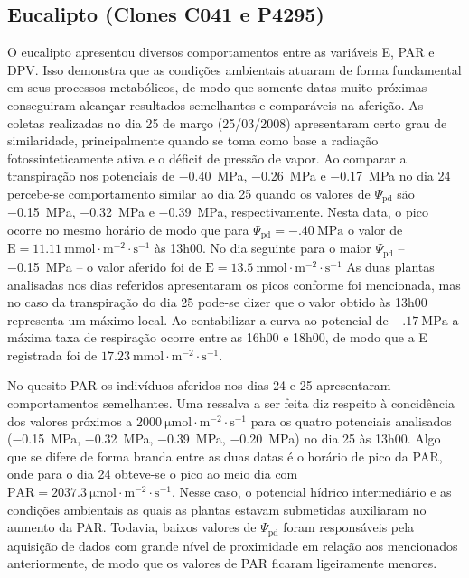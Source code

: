 \documentclass[a4paper, 12pt]{article}
\begin{document}
	\subsection{Eucalipto (Clones C041 e P4295)}
	
	O eucalipto apresentou diversos comportamentos entre as variáveis E, PAR e DPV. Isso demonstra que as condições ambientais atuaram de forma fundamental em seus processos metabólicos, de modo que somente datas muito próximas conseguiram alcançar resultados semelhantes e comparáveis na aferição. As coletas realizadas no dia 25 de março (25/03/2008) apresentaram certo grau de similaridade, principalmente quando se toma como base a radiação fotossinteticamente ativa e o déficit de pressão de vapor. Ao comparar a transpiração nos potenciais de \SI{-.40}{\mega\pascal}, \SI{-.26}{\mega\pascal} e \SI{-.17}{\mega\pascal} no dia 24 percebe-se comportamento similar ao dia 25 quando os valores de $\Psi_{\textrm{pd}}$ são \SI{-.15}{\mega\pascal}, \SI{-.32}{\mega\pascal} e \SI{-.39}{\mega\pascal}, respectivamente. Nesta data, o pico ocorre no mesmo horário de modo que para $\Psi_{\textrm{pd}}=\SI{-.40}{\mega\pascal}$ o valor de $\textrm{E}=\SI{11.11}{\milli\mole\cdot\meter^{-2}\cdot\second^{-1}}$ às 13h00. No dia seguinte para o maior $\Psi_{\textrm{pd}}$ -- \SI{-.15}{\mega\pascal} -- o valor aferido foi de $\textrm{E}=\SI{13.5}{\milli\mole\cdot\meter^{-2}\cdot\second^{-1}}$ As duas plantas analisadas nos dias referidos apresentaram os picos conforme foi mencionada, mas no caso da transpiração do dia 25 pode-se dizer que o valor obtido às 13h00 representa um máximo local. Ao contabilizar a curva ao potencial de $\SI{-.17}{\mega\pascal}$ a máxima taxa de respiração ocorre entre as 16h00 e 18h00, de modo que a E registrada foi de $\SI{17.23}{\milli\mole\cdot\meter^{-2}\cdot\second^{-1}}$.
	
	No quesito PAR os indivíduos aferidos nos dias 24 e 25 apresentaram comportamentos semelhantes. Uma ressalva a ser feita diz respeito à concidência dos valores próximos a $\SI{2000}{\micro\mole\cdot\meter^{-2}\cdot\second^{-1}}$ para os quatro potenciais analisados (\SI{-.15}{\mega\pascal}, \SI{-.32}{\mega\pascal}, \SI{-.39}{\mega\pascal}, \SI{-.20}{\mega\pascal}) no dia 25 às 13h00. Algo que se difere de forma branda entre as duas datas é o horário  de pico da PAR, onde para o dia 24 obteve-se o pico ao meio dia com $\textrm{PAR}=\SI{2037.3}{\micro\mole\cdot\meter^{-2}\cdot\second^{-1}}$. Nesse caso, o potencial hídrico intermediário e as condições ambientais as quais as plantas estavam submetidas auxiliaram no aumento da PAR. Todavia, baixos valores de $\Psi_{\textrm{pd}}$ foram responsáveis pela aquisição de dados com grande nível de proximidade em relação aos mencionados anteriormente, de modo que os valores de PAR ficaram ligeiramente menores.
	
\end{document}
